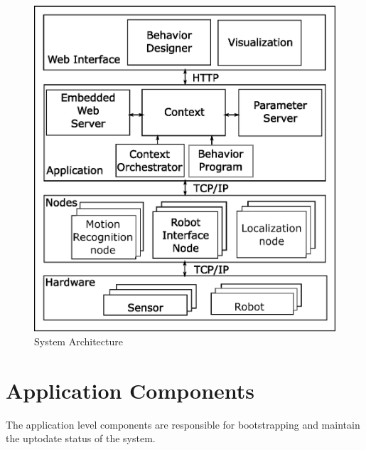 \begin{figure}
\centering
\includegraphics[width=\textwidth]{assets/architecture.eps}
\caption[System Architecture]{System Architecture}
\label{fig:architecture}
\end{figure}
\section{Application Components}
\label{ssec:app_comp}
The application level components are responsible for bootstrapping and maintain the uptodate status of the system. 
